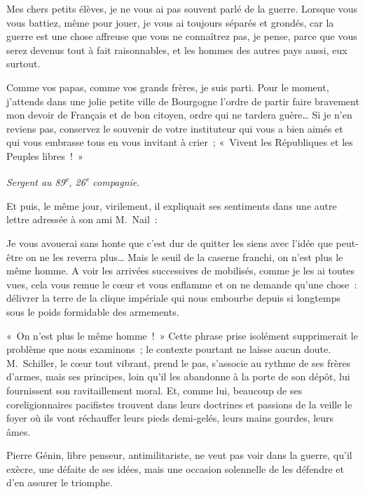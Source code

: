 \documentclass[french,twoside]{book} %
\newenvironment{quoteblock}%
  {\begin{quoting}}
  {\end{quoting}}
\newenvironment{quotebar}{%
    \def\FrameCommand{{\color{rubric!10!}\vrule width 0.5em} \hspace{0.9em}}%
    \def\OuterFrameSep{\itemsep} %
    \MakeFramed {\advance\hsize-\width \FrameRestore}
  }%
  {%
    \endMakeFramed
  }
\renewenvironment{quoteblock}%
  {%
    \savenotes
    \setstretch{0.9}
    \normalfont
    \begin{quotebar}
  }
  {%
    \end{quotebar}
    \spewnotes
  }
\begin{document}
\begin{quoteblock}
 \noindent Mes chers petits élèves, je ne vous ai pas souvent parlé de la guerre. Lorsque vous vous battiez, même pour jouer, je vous ai toujours séparés et grondés, car la guerre est une chose affreuse que vous ne connaîtrez pas, je pense, parce que vous serez devenus tout à fait raisonnables, et les hommes des autres pays aussi, eux surtout.‌\par
 Comme vos papas, comme vos grands frères, je suis parti. Pour le moment, j’attends dans une jolie petite ville de Bourgogne l’ordre de partir faire bravement mon devoir de Français et de bon citoyen, ordre qui ne tardera guère… Si je n’en reviens pas, conservez le souvenir de votre instituteur qui vous a bien aimés et qui vous embrasse tous en vous invitant à crier ; « Vivent les Républiques et les Peuples libres ! »
 \end{quoteblock}

\par
{\itshape Sergent au 89\textsuperscript{e}, 26\textsuperscript{e} compagnie.‌}\par
Et puis, le même jour, virilement, il expliquait ses sentiments dans une autre lettre adressée à son ami M. Nail :‌\par

\begin{quoteblock}
 \noindent Je vous avouerai sans honte que c’est dur de quitter les siens avec l’idée que peut-être on ne les reverra plus… Mais le seuil de la caserne franchi, on n’est plus le même homme. A voir les arrivées successives de mobilisés, comme je les ai toutes vues, cela vous remue le cœur et vous enflamme et on ne demande qu’une chose : délivrer la terre de la clique impériale qui nous embourbe depuis si longtemps sous le poids formidable des armements.‌
 \end{quoteblock}

\noindent « On n’est plus le même homme ! » Cette phrase prise isolément supprimerait le problème que nous examinons ; le contexte pourtant ne laisse aucun doute. M. Schiller, le cœur tout vibrant, prend le pas, s’associe au rythme de ses frères d’armes, mais ses principes, loin qu’il les abandonne à la porte de son dépôt, lui fournissent son ravitaillement moral. Et, comme lui, beaucoup de ses coreligionnaires pacifistes trouvent dans leurs doctrines et passions de la veille le foyer où ils vont réchauffer leurs pieds demi-gelés, leurs mains gourdes, leurs âmes.‌\par
Pierre Génin, libre penseur, antimilitariste, ne veut pas voir dans la guerre, qu’il exècre, une défaite de ses idées, mais une occasion solennelle de les défendre et d’en assurer le triomphe.‌\par
\end{document}
